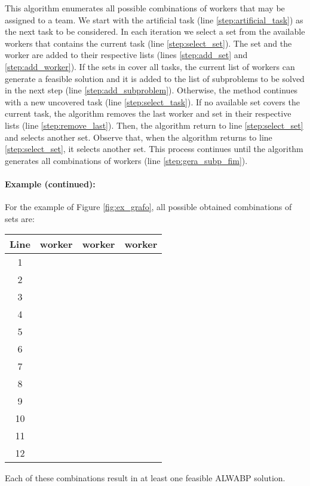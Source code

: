 \documentclass{singlecol-new}
\begin{document}
This algorithm enumerates all possible combinations of workers that may be assigned to a team. We start with the artificial task (line \ref{step:artificial_task}) as the next task to be considered. In each iteration we select a set from the available workers that contains the current task (line \ref{step:select_set}). The set and the worker are added to their respective lists (lines \ref{step:add_set} and \ref{step:add_worker}). If the sets in  cover all tasks, the current list of workers can generate a feasible solution and it is added to the list of subproblems to be solved in the next step (line \ref{step:add_subproblem}). Otherwise, the method continues with a new uncovered task (line \ref{step:select_task}). If no available set covers the current task, the algorithm removes the last worker and set in their respective lists (line \ref{step:remove_last}). Then, the algorithm return to line \ref{step:select_set} and selects another set. Observe that, when the algorithm returns to line \ref{step:select_set}, it selects another set. This process continues until the algorithm generates all combinations of workers (line \ref{step:gera_subp_fim}).

\newpage
\paragraph{Example (continued):} For the example of Figure \ref{fig:ex_grafo}, all possible obtained combinations of sets are:

\begin{center}
\begin{tabular}{c|ccc}
Line & worker  & worker  & worker  \\ \hline
1 &   &  & \\
2 &   &  & \\
3 &   &  & \\
4 &   &  &  \\
5 &   &  &    \\
6 &   &  &  \\
7 &   &     &    \\
8 &   &  & \\
9 &   &  & \\
10 &   &  &  \\
11 &   &  &  \\
12 &    &   & 
\end{tabular}
\end{center}

Each of these combinations result in at least one feasible ALWABP solution.
\end{document}
